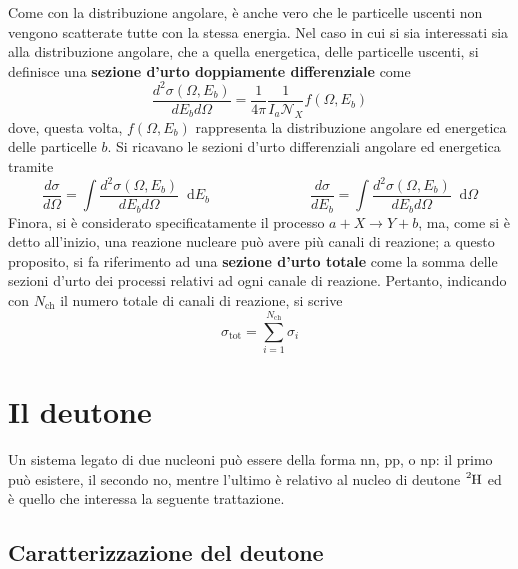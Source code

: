 \documentclass[11pt, a4paper]{scrartcl}
\theoremstyle{style}
\newcommand{\dd}{\mathop{}\!\mathrm{d}}
\numberwithin{equation}{subsection}
\begin{document}
Come con la distribuzione angolare, \`e anche vero che le particelle uscenti non vengono scatterate tutte con la stessa energia.
Nel caso in cui si sia interessati sia alla distribuzione angolare, che a quella energetica, delle particelle uscenti, si definisce una \textbf{sezione d'urto doppiamente differenziale} come
\begin{equation}
	\frac{d ^2 \sigma (\Omega ,E_b)}{d E_b d\Omega } = \frac{1}{4\pi} \frac{1}{I_a \mathcal{N} _X} f(\Omega ,E_b)
\end{equation}
dove, questa volta, $f(\Omega ,E_b)$ rappresenta la distribuzione angolare ed energetica delle particelle $b$.
Si ricavano le sezioni d'urto differenziali angolare ed energetica tramite
\[
\frac{d \sigma }{d \Omega }  = \int \frac{d ^2 \sigma (\Omega ,E_b)}{d E_b d\Omega } \dd E_b \hspace{3cm} \frac{d \sigma }{d E_b}  = \int \frac{d ^2 \sigma (\Omega ,E_b)}{d E_b d\Omega }  \dd \Omega 
\] 
Finora, si \`e considerato specificatamente il processo $a +X \to Y+b$, ma, come si \`e detto all'inizio, una reazione nucleare pu\`o avere pi\`u canali di reazione; a questo proposito, si fa riferimento ad una \textbf{sezione d'urto totale} come la somma delle sezioni d'urto dei processi relativi ad ogni canale di reazione. 
Pertanto, indicando con $N_\text{ch}$ il numero totale di canali di reazione, si scrive
\begin{equation}
	\sigma _\text{tot} = \sum_{i=1}^{N_\text{ch}} \sigma _i
\end{equation}
\newpage

\section{Il deutone}
Un sistema legato di due nucleoni pu\`o essere della forma nn, pp, o np: il primo pu\`o esistere, il secondo no, mentre l'ultimo \`e relativo al nucleo di deutone $\ce{^2H}$ ed \`e quello che interessa la seguente trattazione.

\subsection{Caratterizzazione del deutone}
\end{document}
